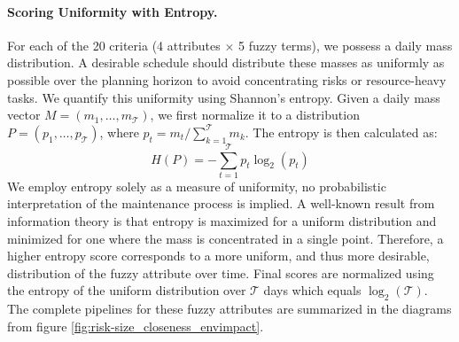 \paragraph{Scoring Uniformity with Entropy.}
For each of the 20 criteria (4 attributes $\times$ 5 fuzzy terms), we possess a daily mass distribution. A desirable schedule should distribute these masses as uniformly as possible over the planning horizon to avoid concentrating risks or resource-heavy tasks. We quantify this uniformity using Shannon's entropy. Given a daily mass vector $M = (m_1, \dots, m_\mathcal{T})$, we first normalize it to a distribution $P = (p_1, \dots, p_\mathcal{T})$, where $p_t = m_t / \sum_{k=1}^\mathcal{T} m_k$. The entropy is then calculated as:
\[
H(P) = - \sum_{t=1}^{\mathcal{T}} p_t \log_2(p_t)
\]
We employ entropy solely as a measure of uniformity, no probabilistic interpretation of the maintenance process is implied. A well-known result from  information theory \cite{Entropy} is that entropy is maximized for a uniform distribution and minimized for one where the mass is concentrated in a single point. Therefore, a higher entropy score corresponds to a more uniform, and thus more desirable, distribution of the fuzzy attribute over time. Final scores are normalized using the entropy of the uniform distribution over $\mathcal{T}$ days which equals $\log_2(\mathcal{T})$.\\

The complete pipelines for these fuzzy attributes are summarized in the diagrams from figure \ref{fig:risk-size_closeness_envimpact}.



